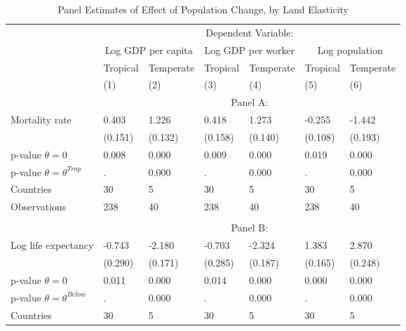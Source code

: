 \documentclass[12pt]{article}
\begin{document}
\clearpage
\begin{table}[!htb]
\begin{center}
\caption{Panel Estimates of Effect of Population Change, by Land Elasticity}
\label{TAB_pop_panel}
{\footnotesize
\begin{tabularx}{\textwidth}{lXXXXXX}
\midrule
 & \multicolumn{6}{c}{Dependent Variable:} \\ \cmidrule(lr){2-7}
 & \multicolumn{2}{c}{Log GDP per capita} & \multicolumn{2}{c}{Log GDP per worker} & \multicolumn{2}{c}{Log population} \\ \cmidrule(lr){2-3} \cmidrule(lr){4-5} \cmidrule(lr){6-7}
 & Tropical & Temperate & Tropical & Temperate & Tropical & Temperate \\
 & (1) & (2) & (3) & (4) & (5) & (6) \\
\midrule
 & \multicolumn{6}{c}{Panel A:} \\ \cmidrule(lr){2-7}
Mortality rate      &       0.403&       1.226&       0.418&       1.273&      -0.255&      -1.442\\
                    &     (0.151)&     (0.132)&     (0.158)&     (0.140)&     (0.108)&     (0.193)\\
\midrule
p-value $\theta=0$  &       0.008&       0.000&       0.009&       0.000&       0.019&       0.000\\
p-value $\theta=\theta^{Trop}$&           .&       0.000&           .&       0.000&           .&       0.000\\
Countries           &          30&           5&          30&           5&          30&           5\\
Observations        &         238&          40&         238&          40&         238&          40\\
\midrule
\\
 & \multicolumn{6}{c}{Panel B:} \\ \cmidrule(lr){2-7}
Log life expectancy &      -0.743&      -2.180&      -0.703&      -2.324&       1.383&       2.870\\
                    &     (0.290)&     (0.171)&     (0.285)&     (0.187)&     (0.165)&     (0.248)\\
\midrule
p-value $\theta=0$  &       0.011&       0.000&       0.014&       0.000&       0.000&       0.000\\
p-value $\theta=\theta^{Below}$&           .&       0.000&           .&       0.000&           .&       0.000\\
Countries           &          30&           5&          30&           5&          30&           5\\

\end{tabularx}}
\end{center}
\end{table}
\end{document}
